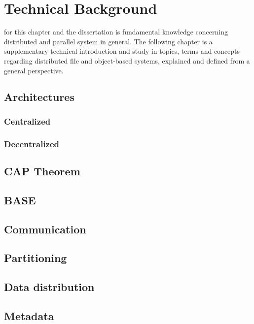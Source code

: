 \chapter{Technical Background}

 for this chapter and the dissertation is fundamental knowledge concerning distributed and parallel system in general. The following chapter is a supplementary technical introduction and study in topics, terms and concepts regarding distributed file and object-based systems, explained and defined from a general perspective.

\section{Architectures} \label{sec:architectures}

\subsection*{Centralized}

\subsection*{Decentralized}

\section{CAP Theorem} \label{sec:cap}


\section{BASE} \label{sec:base}

\section{Communication} \label{sec:communication}

\section{Partitioning} \label{sec:partitioning}

\section{Data distribution} \label{sec:distribution}

\section{Metadata} \label{sec:metadata}
